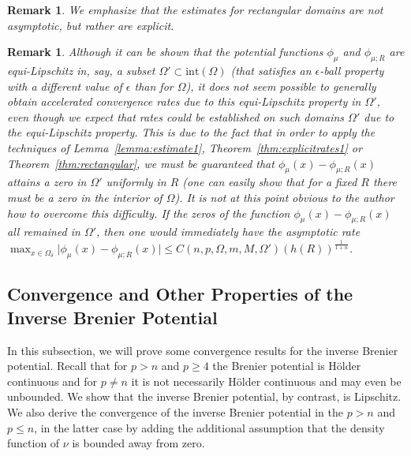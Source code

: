\documentclass{amsart}
\theoremstyle{lemma}
\newtheorem{remark}[theorem]{Remark}
\theoremstyle{remark}
\begin{document}
\begin{remark}
We emphasize that the estimates for rectangular domains are not asymptotic, but rather are explicit.
\end{remark}

\begin{remark}\label{rmk:geq2rates}
Although it can be shown that the potential functions $\phi_{\mu}$ and $\phi_{\mu;R}$ are equi-Lipschitz in, say, a subset $\Omega ' \subset \text{int}(\Omega)$ (that satisfies an $\epsilon$-ball property with a different value of $\epsilon$ than for $\Omega$), it does not seem possible to generally obtain accelerated convergence rates due to this equi-Lipschitz property in $\Omega '$, even though we expect that rates could be established on such domains $\Omega '$ due to the equi-Lipschitz property. This is due to the fact that in order to apply the techniques of Lemma~\ref{lemma:estimate1}, Theorem~\ref{thm:explicitrates1} or Theorem~\ref{thm:rectangular}, we must be guaranteed that $\phi_{\mu}(x) - \phi_{\mu;R}(x)$ attains a zero in $\Omega '$ uniformly in $R$ (one can easily show that for a fixed $R$ there must be a zero in the interior of $\Omega$). It is not at this point obvious to the author how to overcome this difficulty. If the zeros of the function $\phi_{\mu}(x) - \phi_{\mu;R}(x)$ all remained in $\Omega '$, then one would immediately have the asymptotic rate $\max_{x \in \Omega_{\delta}} \vert \phi_{\mu}(x) - \phi_{\mu;R}(x) \vert \leq C(n, p, \Omega, m, M, \Omega ') (h(R))^{\frac{1}{1+n}}$.
\end{remark}



\subsection{Convergence and Other Properties of the Inverse Brenier Potential}\label{sec:inversebrenier}

In this subsection, we will prove some convergence results for the inverse Brenier potential. Recall that for $p >n$ and $p \geq 4$ the Brenier potential is H\"{o}lder continuous and for $p \neq n$ it is not necessarily H\"{o}lder continuous and may even be unbounded. We show that the inverse Brenier potential, by contrast, is Lipschitz. We also derive the convergence of the inverse Brenier potential in the $p > n$ and $p \leq n$, in the latter case by adding the additional assumption that the density function of $\nu$ is bounded away from zero.
\end{document}
